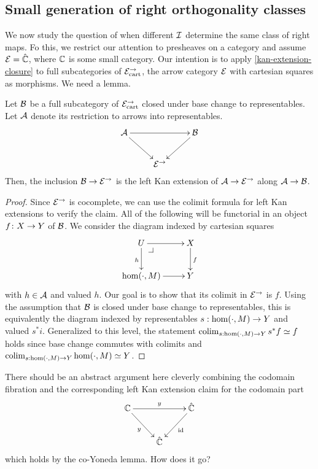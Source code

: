\documentclass[reqno,10pt,a4paper,oneside]{amsart}
\begin{document}
\subsection*{Small generation of right orthogonality classes}

We now study the question of when different $\cal{I}$ determine the same class of right maps. Fo this, we restrict our
attention to  presheaves on a category and assume $\catE = \hat{\cat{C}}$, where $\catC$ is some small category.
Our intention is to apply \cref{kan-extension-closure} to full subcategories of $\catE_{\cart}^{\to}$, the arrow category $\catE$ with cartesian squares as morphisms. We need a lemma.

\begin{lemma}
\label{left-kan-extension-of-representables}
Let $\cal{B}$ be a full subcategory of $\catE_{\cart}^{\to}$ closed under base change to representables.
Let $\cal{A}$ denote its restriction to arrows into representables.
\[
\xymatrix{
  \cal{A}
  \ar[rr]
  \ar[dr]
&&
  \cal{B}
  \ar[dl]
\\&
  \catE^{\to}
}
\]
Then, the inclusion $\cal{B} \to \catE^{\to}$ is the left Kan extension of $\cal{A} \to \catE^{\to}$ along $\cal{A} \to \cal{B}$.
\end{lemma}


\begin{proof}
Since $\catE^{\to}$ is cocomplete, we can use the colimit formula for left Kan extensions to verify the claim.
All of the following will be functorial in an object $f \co X \to Y$ of $\cal{B}$.
We consider the diagram indexed by cartesian squares
\[
\xymatrix{
  U
  \ar[r]
  \ar[d]_{h}
  \pullback{dr}
&
  X
  \ar[d]^{f}
\\
  \hom(\arghole, M)
  \ar[r]
&
  Y
}
\]
with $h \in \cal{A}$ and valued $h$.
Our goal is to show that its colimit in $\catE^{\to}$ is $f$.
Using the assumption that $\cal{B}$ is closed under base change to representables, this is equivalently the diagram indexed by representables $s : \hom(\arghole, M) \to Y$ and valued $s^* i$.
Generalized to this level, the statement $\colim_{s : \hom(\arghole, M) \to Y} s^* f \simeq f$ holds since base change commutes with colimits and 
$\colim_{s : \hom(\arghole, M) \to Y} \hom(\arghole, M) \simeq Y$.
\end{proof}


\begin{question}
There should be an abstract argument here cleverly combining the codomain fibration and the corresponding left Kan extension claim for the codomain part
\[
\xymatrix{
  \cat{C}
  \ar[rr]^{y}
  \ar[dr]_{y}
&&
  \hat{\catC}
  \ar[dl]^{\id}
\\&
  \hat{\cat{C}}
}
\]
which holds by the co-Yoneda lemma.
How does it go?
\end{question}
\end{document}

